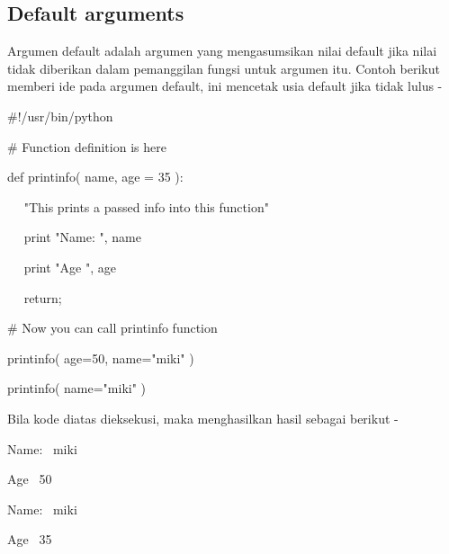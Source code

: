 \documentclass[a4paper,12pt]{report}
\begin{document}
\subsection*{Default arguments}
 \par
\begin{adjustwidth}{0.03in}{0.03in}
Argumen default adalah argumen yang mengasumsikan nilai default jika nilai tidak diberikan dalam pemanggilan fungsi untuk argumen itu. Contoh berikut memberi ide pada argumen default, ini mencetak usia default jika tidak lulus -\end{adjustwidth}
 \par
\noindent 
 \hspace*{0.5in}  $  \#  $!/usr/bin/python \par
\vspace{12pt}
\noindent 
 \hspace*{0.5in}  $  \#  $ Function definition is here \par
\noindent 
 \hspace*{0.5in} def printinfo( name, age = 35 ): \par
\noindent 
 \hspace*{0.5in} ~~ "This prints a passed info into this function" \par
\noindent 
 \hspace*{0.5in} ~~ print "Name: ", name \par
\noindent 
 \hspace*{0.5in} ~~ print "Age ", age \par
\noindent 
 \hspace*{0.5in} ~~ return; \par
\vspace{12pt}
\noindent 
 \hspace*{0.5in}  $  \#  $ Now you can call printinfo function \par
\noindent 
 \hspace*{0.5in} printinfo( age=50, name="miki" ) \par
\noindent 
 \hspace*{0.5in} printinfo( name="miki" ) \par
\begin{adjustwidth}{0.03in}{0.03in}
Bila kode diatas dieksekusi, maka menghasilkan hasil sebagai berikut -\end{adjustwidth}
 \par
\noindent 
 \hspace*{0.5in} Name:~ miki \par
\noindent 
 \hspace*{0.5in} Age~ 50 \par
\noindent 
 \hspace*{0.5in} Name:~ miki \par
\noindent 
 \hspace*{0.5in} Age~ 35 \par
\vspace{20pt}
\end{document}

